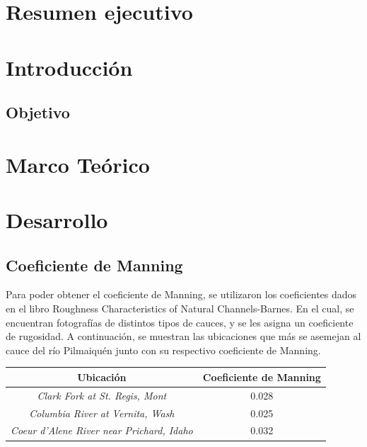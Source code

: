 \documentclass{article} %
\begin{document}
\newpage
\section{Resumen ejecutivo}

\newpage
\tableofcontents %
\newpage
\section{Introducción}
\subsection{Objetivo}
\newpage
\section{Marco Teórico}



\newpage
\section{Desarrollo}
\subsection{Coeficiente de Manning}
Para poder obtener el coeficiente de Manning, se utilizaron los coeficientes dados en el libro Roughness Characteristics of Natural Channels-Barnes. En el cual, se encuentran fotografías de distintos tipos de cauces, y se les asigna un coeficiente de rugosidad. A continuación, se muestran las ubicaciones que más se asemejan al cauce del río Pilmaiquén junto con su respectivo coeficiente de Manning.
\begin{table}[h!]
    \centering
    \begin{tabular}{c c}
        \textbf{Ubicación} & \textbf{Coeficiente de Manning} \\
        \hline
        \textit{Clark Fork at St. Regis, Mont} & 0.028 \\ 
        \textit{Columbia River at Vernita, Wash} & 0.025 \\
        \textit{Coeur d'Alene River near Prichard, Idaho} & 0.032 \\\hline
    \end{tabular}
\end{table}
\end{document}
